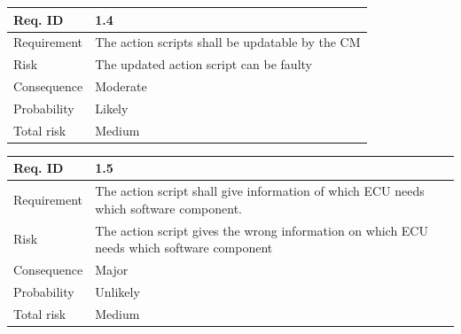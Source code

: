 \begin{table}[H]
\centering
\begin{tabularx}{1.0\textwidth}{
    |p{}%
    |p{}|%
}
\hline
Req. ID
& 1.4
\\
\hline

Requirement
& The action scripts shall be updatable by the CM
\\
\hline

Risk
& 
The updated action script can be faulty
\\
\hline

Consequence
&
Moderate
\\
\hline

Probability
&
Likely
\\
\hline

Total risk
&
Medium
\\
\hline

\end{tabularx}
\end{table}


\begin{table}[H]
\centering
\begin{tabularx}{1.0\textwidth}{
    |p{}%
    |p{}|%
}
\hline
Req. ID
& 1.5
\\
\hline

Requirement
& The action script shall give information of which ECU needs which software component.
\\
\hline

Risk
& 
The action script gives the wrong information on which ECU needs which software component
\\
\hline

Consequence
&
Major
\\
\hline

Probability
& 
Unlikely
\\
\hline

Total risk
&
Medium
\\
\hline

\end{tabularx}
\end{table}


